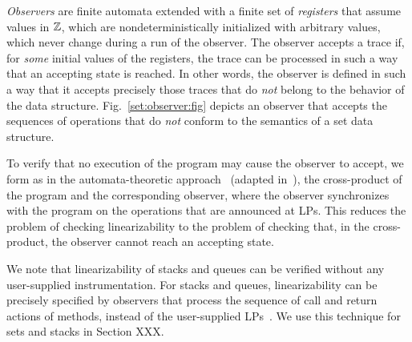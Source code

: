 {\em Observers} are
finite automata extended with a finite set of {\em registers}
that assume values in ${\mathbb Z}$, which are 
nondeterministically initialized with arbitrary values, which never change
during a run of the observer. 
The observer accepts a trace if, for {\em some} initial values of the
registers, the trace can  be processed in such a way that
an accepting state is reached.
In other words, the observer is defined in such a way that it accepts precisely those
traces that do {\em not} belong to the behavior
of the data structure.
%
%
Fig.~\ref{set:observer:fig}
depicts an observer that accepts the
sequences of operations that do {\em not} conform to the semantics of a set
data structure.

To verify that no execution of the program may cause the observer to
accept, we form as in the automata-theoretic approach~\cite{VW:modelchecking}
(adapted in~\cite{AHHR:integrated}),
the cross-product of the program  and the corresponding
observer, where the observer synchronizes with the program on the operations
that are announced at LPs. This reduces the
problem of checking linearizability to the problem of checking
that, in the cross-product, the observer cannot reach an accepting state.

We note that linearizability of stacks and queues can be verified without any
user-supplied instrumentation. For stacks and queues,
linearizability can be precisely specified by
observers that process the sequence of call and return actions of
methods,  instead of the user-supplied LPs~\cite{BEEH:icalp15,HSV:concur13}.
We use this technique for sets and stacks in Section XXX.



